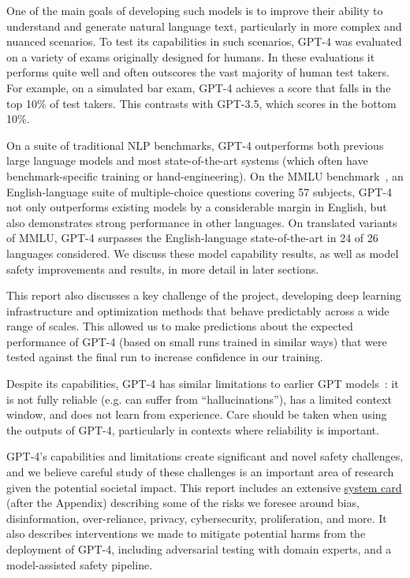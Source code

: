 \documentclass{article}
\begin{document}
One of the main goals of developing such models is to improve their ability to understand and generate natural language text, particularly in more complex and nuanced scenarios.
 To test its capabilities in such scenarios, GPT-4 was evaluated on a variety of exams originally designed for humans. In these evaluations it performs quite well and often outscores the vast majority of human test takers. For example, on a simulated bar exam, GPT-4 achieves a score that falls in the top 10\% of test takers. This contrasts with GPT-3.5, which scores in the bottom 10\%. 
 
 On a suite of traditional NLP benchmarks, GPT-4 outperforms both previous large language models and most state-of-the-art systems (which often have benchmark-specific training or hand-engineering). On the MMLU benchmark~\citep{hendryckstest2021,hendrycks2021ethics}, an English-language suite of multiple-choice questions covering 57 subjects, GPT-4 not only outperforms existing models by a considerable margin in English, but also demonstrates strong performance in other languages. On translated variants of MMLU, GPT-4 surpasses the English-language state-of-the-art in 24 of 26 languages considered. We discuss these model capability results, as well as model safety improvements and results, in more detail in later sections. 

This report also discusses a key challenge of the project, developing deep learning infrastructure and optimization methods that behave predictably across a wide range of scales. This allowed us to make predictions about the expected performance of GPT-4 (based on small runs trained in similar ways) that were tested against the final run to increase confidence in our training. 

Despite its capabilities, GPT-4 has similar limitations to earlier GPT models~\citep{brown2020language,radford2019language,radford2018improving}: it is not fully reliable (e.g. can suffer from ``hallucinations''), has a limited context window, and does not learn from experience. Care should be taken when using the outputs of GPT-4, particularly in contexts where reliability is important. 

GPT-4's capabilities and limitations create significant and novel safety challenges, and we believe careful study of these challenges is an important area of research given the potential societal impact. This report includes an extensive \hyperref[systemcard]{system card} (after the Appendix) describing some of the risks we foresee around bias, disinformation, over-reliance, privacy, cybersecurity, proliferation, and more. It also describes interventions we made to mitigate potential harms from the deployment of GPT-4, including adversarial testing with domain experts, and a model-assisted safety pipeline.
\end{document}

